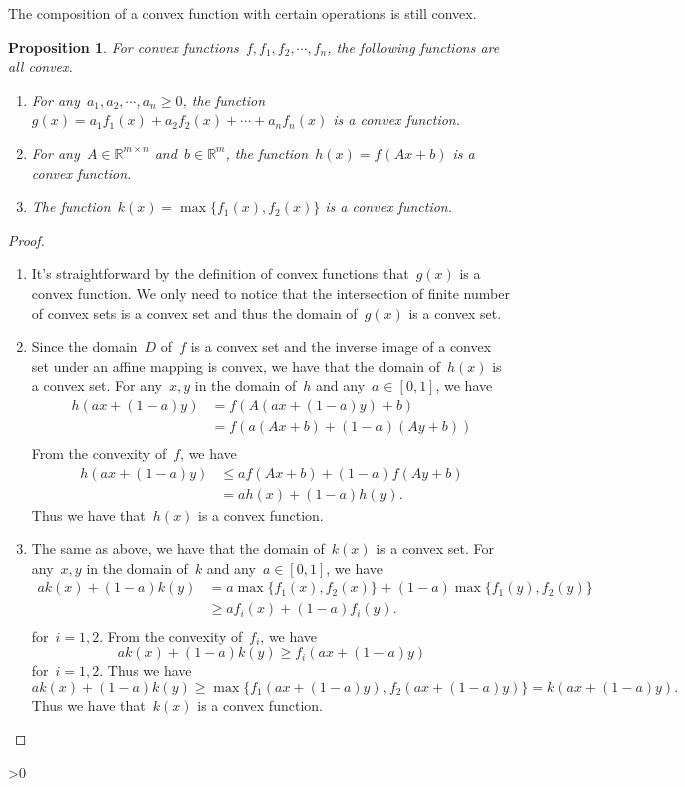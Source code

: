 \documentclass[12pt,a4paper,draft]{article}  %
\newcommand{\bibfile}{\jobname.bib}  %
\newcounter{cite}
\newtheorem{proposition}{Proposition}[section]
\theoremstyle{definition}
\numberwithin{equation}{section}
\newcommand{\RR}{\mathbb{R}}
\begin{document}
The composition of a convex function with certain operations is still convex.
\begin{proposition}
    For convex functions~$f,f_1,f_2,\cdots,f_n$, the following functions are all convex.
    \begin{enumerate}
        \item For any~$a_1,a_2,\cdots,a_n \geq 0$, the function~$g(x) = a_1 f_1(x) + a_2 f_2(x) + \cdots + a_n f_n(x)$ is a convex function.
        \item For any~$A \in \RR^{m \times n}$ and~$b \in \RR^m$, the function~$h(x) = f(Ax+b)$ is a convex function.
        \item The function~$k(x) = \max\{f_1(x),f_2(x)\}$ is a convex function.
    \end{enumerate}
\end{proposition}
\begin{proof}
    \begin{enumerate}
        \item It's straightforward by the definition of convex functions that~$g(x)$ is a convex function. We only need to notice that
        the intersection of finite number of convex sets is a convex set and thus the domain of~$g(x)$ is a convex set.
        \item Since the domain~$D$ of~$f$ is a convex set and the inverse image of a convex set under an affine mapping is convex, we have that the domain of~$h(x)$ is a convex set.
        For any~$x,y$ in the domain of~$h$ and any~$a \in \left[ 0,1 \right]$, we have
        \begin{align*}
            h(ax+(1-a)y) & = f(A(ax+(1-a)y)+b) \\
            & = f(a(Ax+b)+(1-a)(Ay+b)) \\
        \end{align*}
        From the convexity of~$f$, we have
        \begin{align*}
            h(ax+(1-a)y)   & \leq a f(Ax+b) + (1-a) f(Ay+b) \\
            & = a h(x) + (1-a) h(y).
        \end{align*}
        Thus we have that~$h(x)$ is a convex function.
        \item The same as above, we have that the domain of~$k(x)$ is a convex set. For any~$x,y$ in the domain of~$k$ and any~$a \in \left[ 0,1 \right]$, we have
        \begin{align*}
            a k(x) + (1-a) k(y) &= a \max\{f_1(x),f_2(x)\} + (1-a) \max\{f_1(y),f_2(y)\} \\
            & \geq a f_{i}(x) + (1-a) f_{i}(y). \\
        \end{align*}
        for~$i=1,2$.
        From the convexity of~$f_i$, we have
        \[
            a k(x) + (1-a) k(y) \geq f_{i}(ax+(1-a)y)
        \]
        for~$i=1,2$. Thus we have
        \[ a k(x) + (1-a) k(y) \geq \max\{f_1(ax+(1-a)y),f_2(ax+(1-a)y)\} = k(ax+(1-a)y). \]
        Thus we have that~$k(x)$ is a convex function.
    \end{enumerate}
\end{proof}




\ifnum\value{cite}>0
    \small
    
    
\fi

\end{document}
